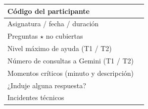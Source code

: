 \documentclass[11pt,letterpaper]{article}
\begin{document}
\begin{center}
\renewcommand{\arraystretch}{1.9}
\begin{tabularx}{\linewidth}{|p{4.8cm}|X|}
\hline
Código del participante & \\ \hline
Asignatura / fecha / duración & \\ \hline
Preguntas $\star$ no cubiertas & \\ \hline
Nivel máximo de ayuda (T1 / T2) & \\ \hline
Número de consultas a Gemini (T1 / T2) & \\ \hline
Momentos críticos (minuto y descripción) & \\[1.2cm] \hline
¿Induje alguna respuesta? & \\[0.8cm] \hline
Incidentes técnicos & \\ \hline
\end{tabularx}
\end{center}

\end{document}
